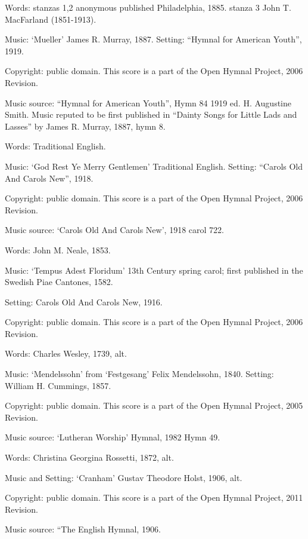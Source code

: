 \begin{multicols}{2}
\par\noindent
Words: stanzas 1,2 anonymous published Philadelphia, 1885.  stanza 3 John T. MacFarland (1851-1913). 
\par\noindent
Music: `Mueller' James R. Murray, 1887.  Setting: ``Hymnal for American Youth'', 1919.
\par\noindent
Copyright: public domain. This score is a part of the Open Hymnal Project, 2006 Revision.
\par\noindent
Music source: ``Hymnal for American Youth'', Hymn 84 1919 ed. H. Augustine Smith. Music reputed to be first published in ``Dainty Songs for Little Lads and Lasses'' by James R. Murray, 1887, hymn 8.

\par\noindent
Words: Traditional English. 
\par\noindent
Music: `God Rest Ye Merry Gentlemen' Traditional English.  Setting: ``Carols Old And Carols New'', 1918.
\par\noindent
Copyright: public domain. This score is a part of the Open Hymnal Project, 2006 Revision.
\par\noindent
Music source: `Carols Old And Carols New', 1918 carol 722.

\par\noindent
Words: John M. Neale, 1853.
\par\noindent
Music: `Tempus Adest Floridum' 13th Century spring carol; first published in the Swedish Piae Cantones, 1582.
\par\noindent
Setting: Carols Old And Carols New, 1916.
\par\noindent
Copyright: public domain. This score is a part of the Open Hymnal Project, 2006 Revision.

\par\noindent
Words: Charles Wesley, 1739, alt. 
\par\noindent
Music: `Mendelssohn' from `Festgesang' Felix Mendelssohn, 1840.  Setting: William H. Cummings, 1857.
\par\noindent
Copyright: public domain. This score is a part of the Open Hymnal Project, 2005 Revision.
\par\noindent
Music source: `Lutheran Worship' Hymnal, 1982 Hymn 49.

\par\noindent
Words: Christina Georgina Rossetti, 1872, alt. 
\par\noindent
Music and Setting: `Cranham' Gustav Theodore Holst, 1906, alt. 
\par\noindent
Copyright: public domain. This score is a part of the Open Hymnal Project, 2011 Revision.
\par\noindent
Music source: ``The English Hymnal, 1906. 


\end{multicols}
